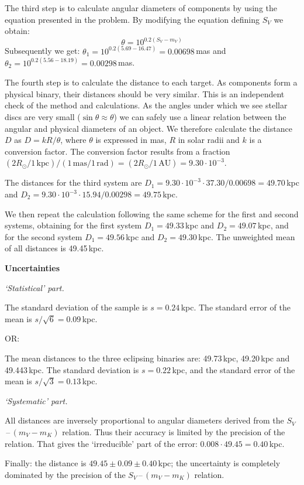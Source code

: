 The third step is to calculate angular diameters of components by using the
equation presented in the problem. By modifying the equation defining $S_V$
we obtain:
\[ \theta = 10^{0.2(S_V - m_V)} \]
Subsequently we get: $\theta_1 = 10^{0.2(5.69-16.47)} = 0.00698$\,mas and
$\theta_2 = 10^{0.2(5.56-18.19)} = 0.00298$\,mas.

The fourth step is to calculate the distance to each target. As components
form a physical binary, their distances should be very similar. This is an
independent check of the method and calculations. As the angles under which
we see stellar discs are very small ($\sin\theta \approx \theta$) we can
safely use a linear relation between the angular and physical diameters of an
object. We therefore calculate the distance $D$ as $D = kR/\theta$, where
$\theta$ is expressed in mas, $R$ in solar radii and $k$ is a conversion
factor. The conversion factor results from a fraction
$(2R_\odot/1\,\mathrm{kpc})/(1\,\mathrm{mas}/1\,\mathrm{rad})
= (2R_\odot/1\,\mathrm{AU}) = 9.30\cdot 10^{-3}$.

The distances for the third system are
$D_1 = 9.30\cdot 10^{-3}\cdot 37.30/0.00698 = 49.70$\,kpc and
$D_2 = 9.30\cdot 10^{-3}\cdot 15.94/0.00298 = 49.75$\,kpc.

We then repeat the calculation following the same scheme for the first and
second systems, obtaining for the first system $D_1 = 49.33$\,kpc and
$D_2 = 49.07$\,kpc, and for the second system $D_1 = 49.56$\,kpc and
$D_2 = 49.30$\,kpc. The unweighted mean of all distances is 49.45\,kpc.

\medskip
\textbf{Uncertainties}

\emph{`Statistical' part.}

The standard deviation of the sample is $s = 0.24$\,kpc. The standard error
of the mean is $s/\sqrt{6} = 0.09$\,kpc.

OR:

The mean distances to the three eclipsing binaries are: 49.73\,kpc,
49.20\,kpc and 49.443\,kpc. The standard deviation is $s = 0.22$\,kpc, and
the standard error of the mean is $s/\sqrt{3} = 0.13$\,kpc.

\emph{`Systematic' part.}

All distances are inversely proportional to angular diameters derived from
the $S_V$\,--\,$(m_V - m_K)$ relation. Thus their accuracy is limited by the
precision of the relation. That gives the `irreducible' part of the error:
$0.008\cdot 49.45 = 0.40$\,kpc.

Finally: the distance is $49.45 \pm 0.09 \pm 0.40$\,kpc; the uncertainty is
completely dominated by the precision of the $S_V$\,--\,$(m_V - m_K)$
relation.

